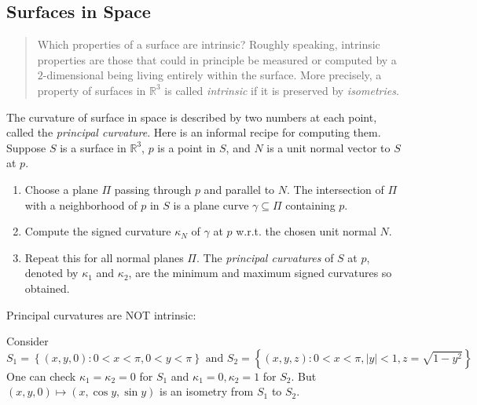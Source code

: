 \subsection{Surfaces in Space}
\label{subsection-surfaces-in-space}

\begin{quote}
  Which properties of a surface are intrinsic?
  Roughly speaking, intrinsic properties are those that could in principle be measured or computed by a \( 2 \)-dimensional being living entirely within the surface.
  More precisely, a property of surfaces in \( \mathbb{R}^3 \) is called \emph{intrinsic} if it is preserved by \emph{isometries}.
\end{quote}

\begin{definition}
  \label{definition-informal-principal-curvature}
  The curvature of surface in space is described by two numbers at each point, called the \emph{principal curvature}.
  Here is an informal recipe for computing them.
  Suppose \( S \) is a surface in \( \mathbb{R}^3 \), \( p \) is a point in \( S \), and \( N \) is a unit normal vector to \( S \) at \( p \).
  \begin{enumerate}
    \item Choose a plane \( \Pi \) passing through \( p \) and parallel to \( N \).
      The intersection of \( \Pi \) with a neighborhood of \( p \) in \( S \) is a plane curve \( \gamma \subseteq \Pi \) containing \( p \).
    \item Compute the signed curvature \( \kappa_N \) of \( \gamma \) at \( p \) w.r.t. the chosen unit normal \( N \).
    \item Repeat this for all normal planes \( \Pi \).
      The \emph{principal curvatures} of \( S \) at \( p \), denoted by \( \kappa_1 \) and \( \kappa_2 \), are the minimum and maximum signed curvatures so obtained.
  \end{enumerate}
\end{definition}
Principal curvatures are NOT intrinsic:
\begin{example}
  \label{example-principal-curvatures-not-intrinsic}
  Consider
  \[
      S_1 = \left\lbrace (x, y, 0): 0 < x < \pi, 0 < y < \pi \right\rbrace \text{ and } S_2 = \left\lbrace (x, y, z) : 0 < x < \pi, \left\lvert y \right\rvert < 1, z = \sqrt{1 - y^2} \right\rbrace 
  \]
  One can check \( \kappa_1 = \kappa_2 = 0 \) for \( S_1 \) and \( \kappa_1 = 0, \kappa_2 = 1 \) for \( S_2 \).
  But \( (x, y, 0) \mapsto (x, \cos y, \sin y) \) is an isometry from \( S_1 \) to \( S_2 \).
\end{example}

